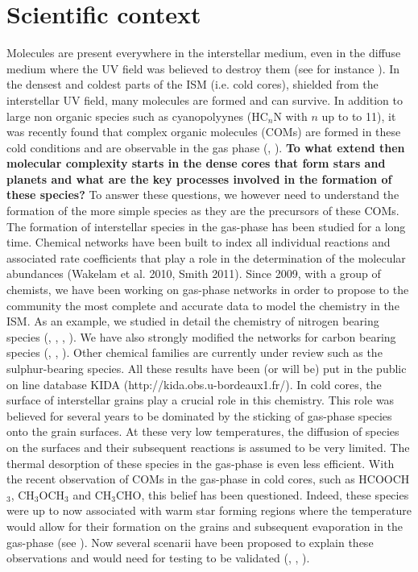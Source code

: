 \section{Scientific context} 


Molecules are present everywhere in the interstellar medium, even in the diffuse medium where the UV field was believed to destroy them (see for instance \cite{2012ApJ...753L..28L}). In the densest and coldest parts of the ISM (i.e. cold cores), shielded from the interstellar UV field, many molecules are formed and can survive. In addition to large non organic species such as cyanopolyynes (HC$_n$N with $n$ up to to 11), it was recently found that complex organic molecules (COMs) are formed in these cold conditions and are observable in the gas phase (\cite{Bacmann_2012}, \cite{2014ApJ...795L...2V}). \textbf{To what extend then molecular complexity starts in the dense cores that form stars and planets and what are the key processes involved in the formation of these species?} To answer these questions, we however need to understand the formation of the more simple species as they are the precursors of these COMs. \\
The formation of interstellar species in the gas-phase has been studied for a long time. Chemical networks have been built to index all individual reactions and associated rate coefficients that play a role in the determination of the molecular abundances (Wakelam et al. 2010, Smith 2011). Since 2009, with a group of chemists, we have been working on gas-phase networks in order to propose to the community the most complete and accurate data to model the chemistry in the ISM. As an example, we studied in detail the chemistry of nitrogen bearing species (\cite{2013PCCP...1513888D}, \cite{2012PNAS..10910233D}, \cite{2014MNRAS.443..398L}, \cite{2013arXiv1310.4350W}). We have also strongly modified the networks for carbon bearing species (\cite{Wakelam_2009}, \cite{2014MNRAS.437..930L}, \cite{2015MNRAS.453L..48W}). Other chemical families are currently under review such as the sulphur-bearing species. All these results have been (or will be) put in the public on line database KIDA (http://kida.obs.u-bordeaux1.fr/).
In cold cores, the surface of interstellar grains play a crucial role in this chemistry. This role was believed for several years to be dominated by the sticking of gas-phase species onto the grain surfaces. At these very low temperatures, the diffusion of species on the surfaces and their subsequent reactions is assumed to be very limited. The thermal desorption of these species in the gas-phase is even less efficient. With the recent observation of COMs in the gas-phase in cold cores, such as HCOOCH$_3$, CH$_3$OCH$_3$ and CH$_3$CHO, this belief has been questioned. Indeed, these species were up to now associated with warm star forming regions where the temperature would allow for their formation on the grains and subsequent evaporation in the gas-phase (see \cite{Herbst_2009}). Now several scenarii have been proposed to explain these observations and would need for testing to be validated (\cite{2013ApJ...769...34V}, \cite{2015MNRAS.449L..16B}, \cite{2015MNRAS.447.4004R}).



